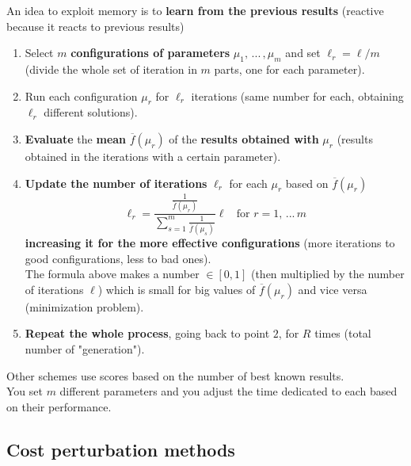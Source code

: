 An idea to exploit memory is to \textbf{learn from the previous results} (reactive because it reacts to previous results)
\begin{enumerate}
	\item Select $m$ \textbf{configurations of parameters} $\mu_1,\, ... \, , \mu_m$ and set $\ell_r = \ell/m$ (divide the whole set of iteration in $m$ parts, one for each parameter).\\
	
	\item Run each configuration $\mu_r$ for $\ell_r$ iterations (same number for each, obtaining $\ell_r$ different solutions).\\
	
	\item \textbf{Evaluate} the \textbf{mean} $\overline{f} (\mu_r)$ of the \textbf{results obtained with} $\mu_r$ (results obtained in the iterations with a certain parameter).\\
	
	\item \textbf{Update the number of iterations} $\ell_r$ for each $\mu_r$ based on $\overline{f} (\mu_r)$
	$$ \ell_r = \frac{ \frac{ 1}{ \overline{f} (\mu_r) } } { \sum_{s=1}^m \frac{ 1 }{ \overline{f} (\mu_s) }} \ell \;\; \text{ for } r = 1, \, ... \, m $$
	\textbf{increasing it for the more effective configurations} (more iterations to good configurations, less to bad ones).\\
	The formula above makes a number $\in [0,1]$ (then multiplied by the number of iterations $\ell$) which is small for big values of $\overline{f} (\mu_r)$ and vice versa (minimization problem).\\
	
	\item \textbf{Repeat the whole process}, going back to point $2$, for $R$ times (total number of "generation").\\
	
\end{enumerate}
Other schemes use scores based on the number of best known results.\\

You set $m$ different parameters and you adjust the time dedicated to each based on their performance.\\

\newpage

\subsection{Cost perturbation methods}


